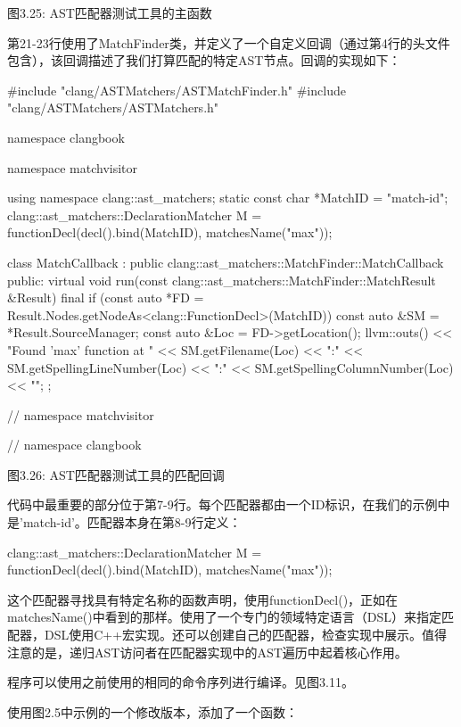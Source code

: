 \begin{center}
图3.25: AST匹配器测试工具的主函数
\end{center}

第21-23行使用了MatchFinder类，并定义了一个自定义回调（通过第4行的头文件包含），该回调描述了我们打算匹配的特定AST节点。回调的实现如下：

\begin{cpp}
#include "clang/ASTMatchers/ASTMatchFinder.h"
#include "clang/ASTMatchers/ASTMatchers.h"

namespace clangbook {
namespace matchvisitor {
using namespace clang::ast_matchers;
static const char *MatchID = "match-id";
clang::ast_matchers::DeclarationMatcher M =
  functionDecl(decl().bind(MatchID), matchesName("max"));

class MatchCallback : public clang::ast_matchers::MatchFinder::MatchCallback {
public:
  virtual void
  run(const clang::ast_matchers::MatchFinder::MatchResult &Result) final {
    if (const auto *FD = Result.Nodes.getNodeAs<clang::FunctionDecl>(MatchID)) {
       const auto &SM = *Result.SourceManager;
       const auto &Loc = FD->getLocation();
       llvm::outs() << "Found 'max' function at " << SM.getFilename(Loc) << ":"
                    << SM.getSpellingLineNumber(Loc) << ":"
                    << SM.getSpellingColumnNumber(Loc) << "\n";
    }
   }
};


} // namespace matchvisitor
} // namespace clangbook
\end{cpp}

\begin{center}
图3.26: AST匹配器测试工具的匹配回调
\end{center}

代码中最重要的部分位于第7-9行。每个匹配器都由一个ID标识，在我们的示例中是'match-id'。匹配器本身在第8-9行定义：

\begin{cpp}
clang::ast_matchers::DeclarationMatcher M =
  functionDecl(decl().bind(MatchID), matchesName("max"));
\end{cpp}

这个匹配器寻找具有特定名称的函数声明，使用functionDecl()，正如在matchesName()中看到的那样。使用了一个专门的领域特定语言（DSL）来指定匹配器，DSL使用C++宏实现。还可以创建自己的匹配器，检查实现中展示。值得注意的是，递归AST访问者在匹配器实现中的AST遍历中起着核心作用。

程序可以使用之前使用的相同的命令序列进行编译。见图3.11。

使用图2.5中示例的一个修改版本，添加了一个函数：

